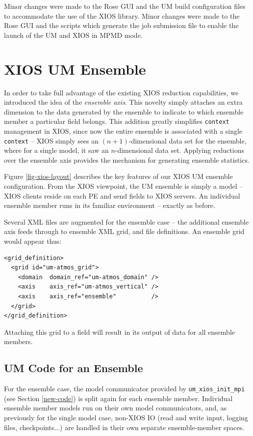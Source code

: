 \documentclass[twocolumn, 12pt]{paper}
\begin{document}
Minor changes were made to the Rose GUI and the UM build configuration files to accommodate the use of the XIOS library.
Minor changes were made to the Rose GUI and the scripts which generate the job submission file to enable the launch of the UM and XIOS in MPMD mode.


\section{XIOS UM Ensemble}
\label{um-ensemble}


In order to take full advantage of the existing XIOS reduction capabilities, we introduced the idea of the \textit{ensemble axis}.
This novelty simply attaches an extra dimension to the data generated by the ensemble to indicate to which ensemble member a particular field belongs.
This addition greatly simplifies \texttt{context} management in XIOS, since now the entire ensemble is associated with a single \texttt{context} -- XIOS simply sees an $(n+1)$-dimensional data set for the ensemble, where for a single model, it saw an $n$-dimensional data set.
Applying reductions over the ensemble axis provides the mechanism for generating ensemble statistics.

Figure \ref{fig-xios-layout} describes the key features of our XIOS UM ensemble configuration.
From the XIOS viewpoint, the UM ensemble is simply a model -- XIOS clients reside on each PE and send fields to XIOS servers.
An individual ensemble member runs in its familiar environment -- exactly as before.

Several XML files are augmented for the ensemble case -- the additional ensemble axis feeds through to ensemble XML grid, and file definitions.
An ensemble grid would appear thus:

\begin{verbatim}
<grid_definition>
  <grid id="um-atmos_grid">
    <domain  domain_ref="um-atmos_domain" />
    <axis    axis_ref="um-atmos_vertical" />
    <axis    axis_ref="ensemble"          />
  </grid>
</grid_definition>
\end{verbatim}

Attaching this grid to a field will result in its output of data for all ensemble members.

\subsection{UM Code for an Ensemble}

For the ensemble case, the model communicator provided by \texttt{um\_xios\_init\_mpi} (see Section \ref{new-code}) is split again for each ensemble member.
Individual ensemble member models run on their own model communicators, and, as previously for the single model case, non-XIOS IO (read and write input, logging files, checkpoints...) are handled in their own separate ensemble-member spaces.
\end{document}
